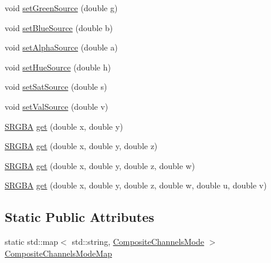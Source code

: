 \begin{DoxyCompactItemize}
\item 
void \hyperlink{classanl_1_1CRGBACompositeChannels_a4ea9eca3932ce0246ad0e366baa04a43}{setGreenSource} (double g)
\item 
void \hyperlink{classanl_1_1CRGBACompositeChannels_a0ee9217cb51a7732e6fdd262fda1888c}{setBlueSource} (double b)
\item 
void \hyperlink{classanl_1_1CRGBACompositeChannels_a647af6a0a510cd42882ed6ebc6c6e23b}{setAlphaSource} (double a)
\item 
void \hyperlink{classanl_1_1CRGBACompositeChannels_a734095656e3aa7fd5dd9247d513c164c}{setHueSource} (double h)
\item 
void \hyperlink{classanl_1_1CRGBACompositeChannels_ae9a1eb914934acff7c7c0d94ef700a96}{setSatSource} (double s)
\item 
void \hyperlink{classanl_1_1CRGBACompositeChannels_a3bdc942dc882f6bd5121b92b63412a29}{setValSource} (double v)
\item 
\hyperlink{structanl_1_1SRGBA}{SRGBA} \hyperlink{classanl_1_1CRGBACompositeChannels_afbae35ad9a4608d0d2a375636b538d8f}{get} (double x, double y)
\item 
\hyperlink{structanl_1_1SRGBA}{SRGBA} \hyperlink{classanl_1_1CRGBACompositeChannels_a9c3fb9f5a932d5cdd585d53ecab11fa5}{get} (double x, double y, double z)
\item 
\hyperlink{structanl_1_1SRGBA}{SRGBA} \hyperlink{classanl_1_1CRGBACompositeChannels_a3964f2c61aa0b8976a40487088dfcc6b}{get} (double x, double y, double z, double w)
\item 
\hyperlink{structanl_1_1SRGBA}{SRGBA} \hyperlink{classanl_1_1CRGBACompositeChannels_a2597ea3895f3389a713fbe79232ffeff}{get} (double x, double y, double z, double w, double u, double v)
\end{DoxyCompactItemize}
\subsection*{Static Public Attributes}
\begin{DoxyCompactItemize}
\item 
static std::map$<$ std::string, \hyperlink{namespaceanl_a8ce7a219c5f8832dd259498378526225}{CompositeChannelsMode} $>$ \hyperlink{classanl_1_1CRGBACompositeChannels_a5ab99299c326366e592ce98ad9ebd392}{CompositeChannelsModeMap}
\end{DoxyCompactItemize}
